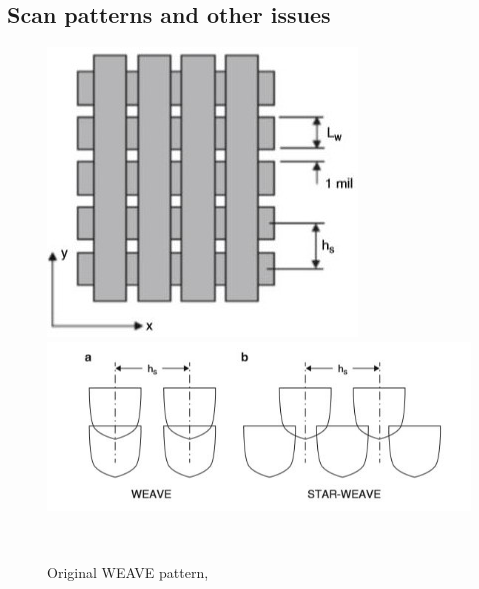\documentclass[a4paper, twoside, 11pt]{report}
\begin{document}
\subsection{Scan patterns and other issues}
%
\begin{figure}[!t]
  \centering
  \begin{minipage}[b]{0.45\textwidth}
    \includegraphics[width=\textwidth]{weave1}
  \end{minipage}
  \hfill
  \begin{minipage}[b]{0.45\textwidth}
    \includegraphics[width=\textwidth]{weave2}
  \end{minipage}
  \\[1pt]
  \begin{minipage}[t]{0.45\textwidth}
    \caption{Original WEAVE pattern, \cite[p. 87]{AMT}}
  \end{minipage}
  \hfill
  \begin{minipage}[t]{0.45\textwidth}

\end{minipage}
\end{figure}
\end{document}
